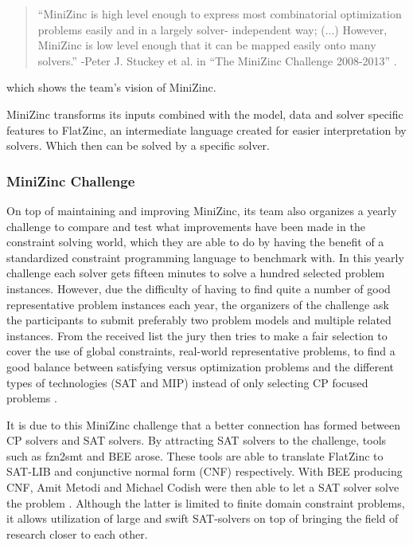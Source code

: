 \begin{quote}
	“MiniZinc is high level enough to express most combinatorial optimization problems easily and in a largely solver-
	independent way; (...) However, MiniZinc is low level enough that it can be mapped easily onto many solvers.” 
	\newline
	-Peter J. Stuckey et al. in “The MiniZinc Challenge 2008-2013” \cite{58stuckey2014minizinc}.
\end{quote} which shows the team’s vision of MiniZinc.

MiniZinc transforms its inputs combined with the model, data and solver specific features to FlatZinc, an intermediate language created for easier interpretation by solvers. Which then can be solved by a specific solver.


\subsubsection{MiniZinc Challenge}
On top of maintaining and improving MiniZinc, its team also organizes a yearly challenge to compare and test what improvements have been made in the constraint solving world, which they are able to do by having the benefit of a standardized constraint programming language to benchmark with. 
In this yearly challenge each solver gets fifteen minutes to solve a hundred selected problem instances. However, due the difficulty of having to find quite a number of good representative problem instances each year, the organizers of the challenge ask the participants to submit preferably two problem models and multiple related instances. From the received list the jury then tries to make a fair selection to cover the use of global constraints, real-world representative problems, to find a good balance between satisfying versus optimization problems and the different types of technologies (SAT and MIP) instead of only selecting CP focused problems \cite{58stuckey2014minizinc}.

It is due to this MiniZinc challenge that a better connection has formed between CP solvers and SAT solvers. By attracting SAT solvers to the challenge, tools such as fzn2smt \cite{72bofill2010system} and BEE \cite{69BEEmetodi2012compiling} arose. These tools are able to translate FlatZinc to SAT-LIB and conjunctive normal form (CNF) respectively. 
With BEE producing CNF, Amit Metodi and Michael Codish were then able to let a SAT solver solve the problem \cite{69BEEmetodi2012compiling}. Although the latter is limited to finite domain constraint problems, it allows utilization of large and swift SAT-solvers on top of bringing the field of research closer to each other.

